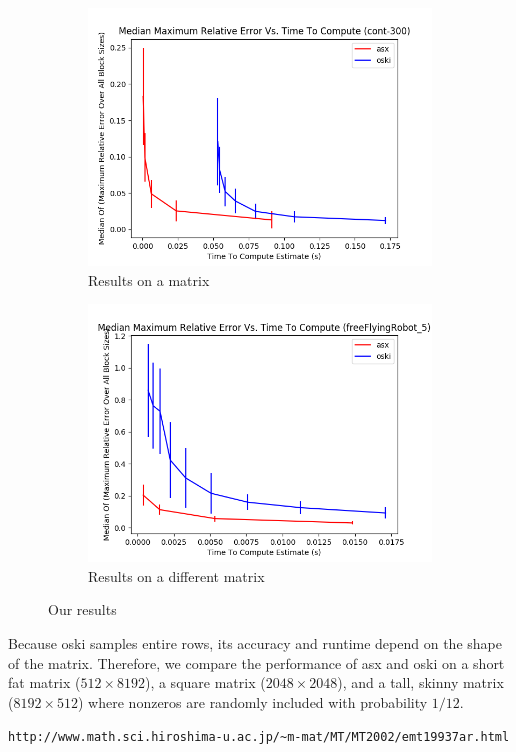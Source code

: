   \begin{figure}
  \centering
  \begin{subfigure}{.5\textwidth}
    \centering
    \includegraphics[width=1.0\linewidth]{../code/roi_cont-300.png}
    \caption{Results on a matrix}
    \label{fig:sub1}
  \end{subfigure}%
  \begin{subfigure}{.5\textwidth}
    \centering
    \includegraphics[width=1.0\linewidth]{../code/roi_freeFlyingRobot_5.png}
    \caption{Results on a different matrix}
    \label{fig:sub2}
  \end{subfigure}
  \caption{Our results}
  \label{fig:test}
  \end{figure}

  Because oski samples entire rows, its accuracy and runtime depend on the shape of the matrix. Therefore, we compare the performance of asx and oski on a short fat matrix ($512 \times 8192$), a square matrix ($2048 \times 2048$), and a tall, skinny matrix ($8192 \times 512$) where nonzeros are randomly included with probability $1/12$. 


  \verb|http://www.math.sci.hiroshima-u.ac.jp/~m-mat/MT/MT2002/emt19937ar.html|

